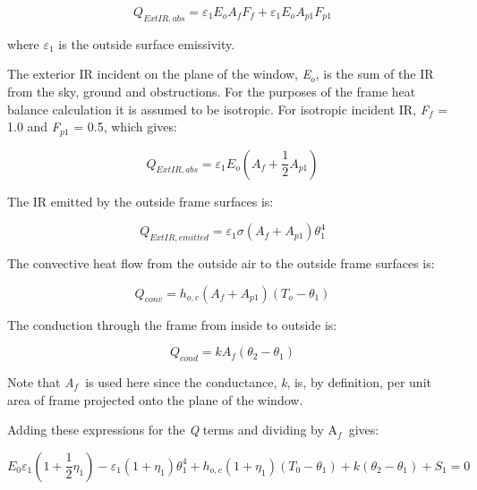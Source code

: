 \begin{equation}
{Q_{ExtIR,abs}} = {\varepsilon_1}{E_o}{A_f}{F_f} + {\varepsilon_1}{E_o}{A_{p1}}{F_{p1}}
\end{equation}

where \emph{\(\varepsilon\)\(_{1}\)} is the outside surface emissivity.

The exterior IR incident on the plane of the window, \emph{E\(_{o}\)}, is the sum of the IR from the sky, ground and obstructions. For the purposes of the frame heat balance calculation it is assumed to be isotropic. For isotropic incident IR, \emph{F\(_{f}\)} = 1.0 and \emph{F\(_{p1}\)} = 0.5, which gives:

\begin{equation}
{Q_{ExtIR,abs}} = {\varepsilon_1}{E_o}({A_f} + \frac{1}{2}{A_{p1}})
\end{equation}

The IR emitted by the outside frame surfaces is:

\begin{equation}
{Q_{ExtIR,emitted}} = {\varepsilon_1}\sigma ({A_f} + {A_{p1}})\theta_1^4
\end{equation}

The convective heat flow from the outside air to the outside frame surfaces is:

\begin{equation}
{Q_{conv}} = {h_{o,c}}({A_f} + {A_{p1}})({T_o} - {\theta_1})
\end{equation}

The conduction through the frame from inside to outside is:

\begin{equation}
{Q_{cond}} = k{A_f}({\theta_2} - {\theta_1})
\end{equation}

Note that \emph{A\(_{f}\)}~is used here since the conductance, \emph{k}, is, by definition, per unit area of frame projected onto the plane of the window.

Adding these expressions for the \emph{Q} terms and dividing by A\(_{f}\)~gives:

\begin{equation}
{E_0}{\varepsilon_1}\left( {1 + \frac{1}{2}{\eta_1}} \right) - {\varepsilon_1}\left( {1 + {\eta_1}} \right)\theta_1^4 + {h_{o,c}}\left( {1 + {\eta_1}} \right)\left( {{T_0} - {\theta_1}} \right) + k\left( {{\theta_2} - {\theta_1}} \right) + {S_1} = 0
\label{eq:E0epsilon1Equation}
\end{equation}

